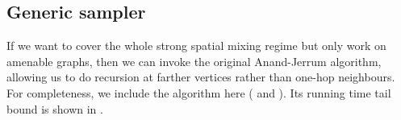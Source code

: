 \documentclass[11pt,a4paper]{amsart}
\renewcommand{\Pr}{\mathop{\mathrm{Pr}}\nolimits}
\theoremstyle{definition}
\theoremstyle{remark}
\newcommand{\hcsampler}{\mathsf{HardcoreSampler}}
\begin{document}

\subsection{Generic sampler}

If we want to cover the whole strong spatial mixing regime but only work on amenable graphs, then we can invoke the original Anand-Jerrum algorithm, allowing us to do recursion at farther vertices rather than one-hop neighbours. 
For completeness, we include the algorithm here ( and ). 
Its running time tail bound is shown in \cite[Lemma B.10]{FGWWY22}. 
\end{document}
